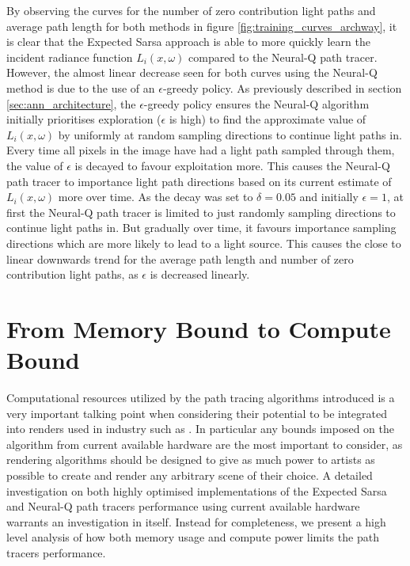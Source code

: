\documentclass[../dissertation.tex]{subfiles}
\begin{document}
By observing the curves for the number of zero contribution light paths and average path length for both methods in figure \ref{fig:training_curves_archway}, it is clear that the Expected Sarsa approach is able to more quickly learn the incident radiance function $L_i(x, \omega)$ compared to the Neural-Q path tracer. However, the almost linear decrease seen for both curves using the Neural-Q method is due to the use of an $\epsilon$-greedy policy. As previously described in section \ref{sec:ann_architecture}, the $\epsilon$-greedy policy ensures the Neural-Q algorithm initially prioritises exploration ($\epsilon$ is high) to find the approximate value of $L_i(x,\omega)$ by uniformly at random sampling directions to continue light paths in. Every time all pixels in the image have had a light path sampled through them, the value of $\epsilon$ is decayed to favour exploitation more. This causes the Neural-Q path tracer to importance light path directions based on its current estimate of $L_i(x, \omega)$ more over time. As the decay was set to $\delta = 0.05$ and initially $\epsilon = 1$, at first the Neural-Q path tracer is limited to just randomly sampling directions to continue light paths in. But gradually over time, it favours importance sampling directions which are more likely to lead to a light source. This causes the close to linear downwards trend for the average path length and number of zero contribution light paths, as $\epsilon$ is decreased linearly. 

\section{From Memory Bound to Compute Bound}
\label{sec:mem_to_comp}

Computational resources utilized by the path tracing algorithms introduced is a very important talking point when considering their potential to be integrated into renders used in industry such as \cite{georgiev2018arnold, christensen2018renderman, hyperion}. In particular any bounds imposed on the algorithm from current available hardware are the most important to consider, as rendering algorithms should be designed to give as much power to artists as possible to create and render any arbitrary scene of their choice. A detailed investigation on both highly optimised implementations of the Expected Sarsa and Neural-Q path tracers performance using current available hardware warrants an investigation in itself. Instead for completeness, we present a high level analysis of how both memory usage and compute power limits the path tracers performance.
\end{document}
